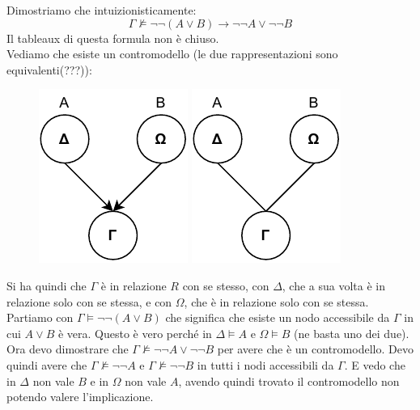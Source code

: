 \documentclass[a4paper,12pt, oneside]{book}
\begin{document}
\begin{esempio}
  Dimostriamo che intuizionisticamente:
  \[\Gamma\nvDash \neg\neg (A\lor B)\to \neg\neg A\lor \neg \neg B\]
  Il tableaux di questa formula non è chiuso.\\
  Vediamo che esiste un contromodello (le due rappresentazioni sono
  equivalenti(???)):  
  \begin{figure}[H]
    \centering
    \includegraphics[scale = 0.9]{img/k2.pdf}
    \includegraphics[scale = 0.9]{img/k3.pdf}
  \end{figure}
  Si ha quindi che $\Gamma$ è in relazione $R$ con se stesso, con $\Delta$, che
  a sua volta è in relazione solo con se stessa, e con $\Omega$, che è in
  relazione solo con se stessa. \\
  Partiamo con $\Gamma\vDash \neg\neg (A\lor B)$ che significa che esiste un
  nodo accessibile da $\Gamma$ in cui $A\lor B$ è vera. Questo è vero perché in
  $\Delta\vDash A$ e $\Omega\vDash B$ (ne basta uno dei due).\\
  Ora devo dimostrare che $\Gamma\nvDash\neg\neg A\lor \neg \neg B$ per avere
  che è un contromodello. Devo quindi avere che $\Gamma\nvDash \neg\neg A$ e
  $\Gamma\nvDash \neg\neg B$ in tutti i nodi accessibili da $\Gamma$. E vedo che
  in $\Delta$ non vale $B$ e in $\Omega$ non vale $A$, avendo quindi trovato il
  contromodello non potendo valere l'implicazione.
\end{esempio}
\end{document}
